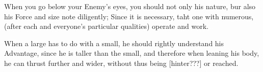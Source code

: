 \newpage


\newpage





When you go below your Enemy's eyes, you should not only his nature,
bur also his Force and size note diligently; Since it is necessary,
taht one with numerous, (after each and everyone's particular
qualities) operate and work.

When a large has to do with a small, he should rightly understand his
Advantage, since he is taller than the small, and therefore when
leaning his body, he can thrust further and wider, without thus being
[hinter???] or reached.

